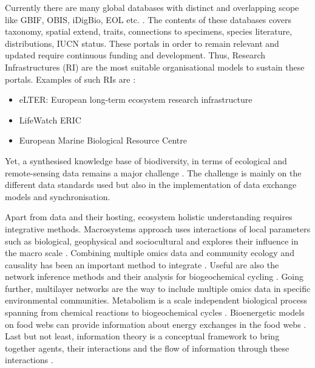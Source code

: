 Currently there are many global databases with distinct and overlapping 
scope like GBIF, OBIS, iDigBio, EOL etc. \parencite{feng2022Review}. 
The contents of these databases covers taxonomy, spatial extend, traits, 
connections to specimens, species literature, distributions,
IUCN status. These portals in order to remain relevant and updated require 
continuous funding and development. Thus, Research Infrastructures (RI) are 
the most suitable organisational models to sustain these portals. Examples 
of such RIs are :

\begin{itemize}

    \item eLTER: European long-term ecosystem research infrastructure 
    \item LifeWatch ERIC
    \item European Marine Biological Resource Centre

\end{itemize}

Yet, a synthesised knowledge base of biodiversity, in terms of ecological and
remote-sensing data remains a major challenge \parencite{feng2022Review}. The challenge
is mainly on the different data standards used but also in the implementation of 
data exchange models and synchronisation.

Apart from data and their hosting, ecosystem holistic understanding requires
integrative methods. Macrosystems approach uses interactions of local parameters
such as biological, geophysical and sociocultural and explores their influence in
the macro scale \parencite{heffernan2014}. Combining multiple omics data and community ecology and causality has
been an important method to integrate \parencite{jurburg2022community}. Useful are also the network inference methods 
and their analysis for biogeochemical cycling \parencite{jameson2023Network}. Going further, multilayer networks \parencite{marine-multilayers}
are the way to include multiple omics data in specific environmental communities. 
Metabolism is a scale independent biological process spanning from chemical reactions
to biogeochemical cycles \parencite{hall2018understanding}. Bioenergetic models on food 
webs can provide information about energy exchanges in the food webs \parencite{valdovinos2023bioenergetic}.
Last but not least, information theory is a conceptual framework to bring together agents,
their interactions and the flow of information through these interactions \parencite{oconnor-information-ecology}.

